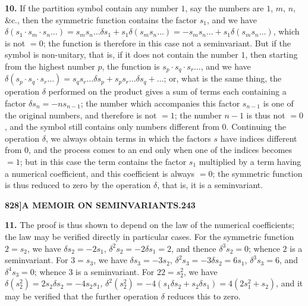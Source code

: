 \documentclass[12pt,a4paper]{article}
\theoremstyle{definition}
\begin{document}
\noindent\textbf{10.} If the partition symbol contain any number $1$, say the numbers are $1$, $m$, $n$, \&c., then the symmetric function contains the factor $s_1$, and we have $\delta(s_1 \cdot s_m \cdot s_n \dots) = s_m s_n \dots \delta s_1 + s_1 \delta(s_m s_n \dots) = -s_m s_n \dots + s_1 \delta(s_m s_n \dots)$, which is not $= 0$; the function is therefore in this case not a seminvariant. But if the symbol is non-unitary, that is, if it does not contain the number $1$, then starting from the highest number $p$, the function is $s_p \cdot s_q \cdot s_r \dots$, and we have $\delta(s_p \cdot s_q \cdot s_r \dots) = s_q s_r \dots \delta s_p + s_p s_r \dots \delta s_q + \dots$; or, what is the same thing, the operation $\delta$ performed on the product gives a sum of terms each containing a factor $\delta s_n = -ns_{n-1}$; the number which accompanies this factor $s_{n-1}$ is one of the original numbers, and therefore is not $= 1$; the number $n-1$ is thus not $= 0$, and the symbol still contains only numbers different from $0$. Continuing the operation $\delta$, we always obtain terms in which the factors $s$ have indices different from $0$, and the process comes to an end only when one of the indices becomes $= 1$; but in this case the term contains the factor $s_1$ multiplied by a term having a numerical coefficient, and this coefficient is always $= 0$; the symmetric function is thus reduced to zero by the operation $\delta$, that is, it is a seminvariant.

\newpage
\setcounter{page}{243}

\noindent\textbf{828]}\hfill\textbf{A MEMOIR ON SEMINVARIANTS.}\hfill\textbf{243}

\bigskip

\noindent\textbf{11.} The proof is thus shown to depend on the law of the numerical coefficients; the law may be verified directly in particular cases. For the symmetric function $2 = s_2$, we have $\delta s_2 = -2s_1$, $\delta^2 s_2 = -2\delta s_1 = 2$, and thence $\delta^3 s_2 = 0$; whence $2$ is a seminvariant. For $3 = s_3$, we have $\delta s_3 = -3s_2$, $\delta^2 s_3 = -3\delta s_2 = 6s_1$, $\delta^3 s_3 = 6$, and $\delta^4 s_3 = 0$; whence $3$ is a seminvariant. For $22 = s_2^2$, we have $\delta(s_2^2) = 2s_2 \delta s_2 = -4s_2 s_1$, $\delta^2(s_2^2) = -4(s_1 \delta s_2 + s_2 \delta s_1) = 4(2s_1^2 + s_2)$, and it may be verified that the further operation $\delta$ reduces this to zero.
\end{document}
